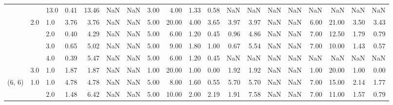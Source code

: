 \begin{tabular}{lllrrrrrrrrrrrrrrrr}
       &     & 13.0 &      0.41 &      13.46 &               NaN &                NaN & 3.00 &   4.00 &             1.33 &                         0.58 &       NaN &        NaN &               NaN &                NaN &  NaN &    NaN &              NaN &                          NaN \\
       & 2.0 & 1.0  &      3.76 &       3.76 &               NaN &                NaN & 5.00 &  20.00 &             4.00 &                         3.65 &      3.97 &       3.97 &               NaN &                NaN & 6.00 &  21.00 &             3.50 &                         3.43 \\
       &     & 2.0  &      0.40 &       4.29 &               NaN &                NaN & 5.00 &   6.00 &             1.20 &                         0.45 &      0.96 &       4.86 &               NaN &                NaN & 7.00 &  12.50 &             1.79 &                         0.79 \\
       &     & 3.0  &      0.65 &       5.02 &               NaN &                NaN & 5.00 &   9.00 &             1.80 &                         1.00 &      0.67 &       5.54 &               NaN &                NaN & 7.00 &  10.00 &             1.43 &                         0.57 \\
       &     & 4.0  &      0.39 &       5.47 &               NaN &                NaN & 5.00 &   6.00 &             1.20 &                         0.45 &       NaN &        NaN &               NaN &                NaN &  NaN &    NaN &              NaN &                          NaN \\
       & 3.0 & 1.0  &      1.87 &       1.87 &               NaN &                NaN & 1.00 &  20.00 &             1.00 &                         0.00 &      1.92 &       1.92 &               NaN &                NaN & 1.00 &  20.00 &             1.00 &                         0.00 \\
(6, 6) & 1.0 & 1.0  &      4.78 &       4.78 &               NaN &                NaN & 5.00 &   8.00 &             1.60 &                         0.55 &      5.70 &       5.70 &               NaN &                NaN & 7.00 &  15.00 &             2.14 &                         1.77 \\
       &     & 2.0  &      1.48 &       6.42 &               NaN &                NaN & 5.00 &  10.00 &             2.00 &                         2.19 &      1.91 &       7.58 &               NaN &                NaN & 7.00 &  11.00 &             1.57 &                         0.79 \\

\end{tabular}
